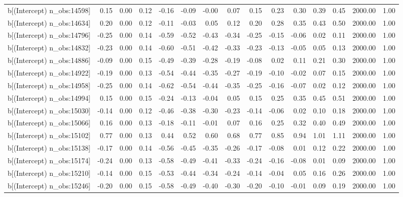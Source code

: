\begin{table}[ht]
\begin{tabular}{rrrrrrrrrrrrrrr}
  b[(Intercept) n\_obs:14598] & 0.15 & 0.00 & 0.12 & -0.16 & -0.09 & -0.00 & 0.07 & 0.15 & 0.23 & 0.30 & 0.39 & 0.45 & 2000.00 & 1.00 \\ 
  b[(Intercept) n\_obs:14634] & 0.20 & 0.00 & 0.12 & -0.11 & -0.03 & 0.05 & 0.12 & 0.20 & 0.28 & 0.35 & 0.43 & 0.50 & 2000.00 & 1.00 \\ 
  b[(Intercept) n\_obs:14796] & -0.25 & 0.00 & 0.14 & -0.59 & -0.52 & -0.43 & -0.34 & -0.25 & -0.15 & -0.06 & 0.02 & 0.11 & 2000.00 & 1.00 \\ 
  b[(Intercept) n\_obs:14832] & -0.23 & 0.00 & 0.14 & -0.60 & -0.51 & -0.42 & -0.33 & -0.23 & -0.13 & -0.05 & 0.05 & 0.13 & 2000.00 & 1.00 \\ 
  b[(Intercept) n\_obs:14886] & -0.09 & 0.00 & 0.15 & -0.49 & -0.39 & -0.28 & -0.19 & -0.08 & 0.02 & 0.11 & 0.21 & 0.30 & 2000.00 & 1.00 \\ 
  b[(Intercept) n\_obs:14922] & -0.19 & 0.00 & 0.13 & -0.54 & -0.44 & -0.35 & -0.27 & -0.19 & -0.10 & -0.02 & 0.07 & 0.15 & 2000.00 & 1.00 \\ 
  b[(Intercept) n\_obs:14958] & -0.25 & 0.00 & 0.14 & -0.62 & -0.54 & -0.44 & -0.35 & -0.25 & -0.16 & -0.07 & 0.02 & 0.12 & 2000.00 & 1.00 \\ 
  b[(Intercept) n\_obs:14994] & 0.15 & 0.00 & 0.15 & -0.24 & -0.13 & -0.04 & 0.05 & 0.15 & 0.25 & 0.35 & 0.45 & 0.51 & 2000.00 & 1.00 \\ 
  b[(Intercept) n\_obs:15030] & -0.14 & 0.00 & 0.12 & -0.46 & -0.38 & -0.30 & -0.23 & -0.14 & -0.06 & 0.02 & 0.10 & 0.18 & 2000.00 & 1.00 \\ 
  b[(Intercept) n\_obs:15066] & 0.16 & 0.00 & 0.13 & -0.18 & -0.11 & -0.01 & 0.07 & 0.16 & 0.25 & 0.32 & 0.40 & 0.49 & 2000.00 & 1.00 \\ 
  b[(Intercept) n\_obs:15102] & 0.77 & 0.00 & 0.13 & 0.44 & 0.52 & 0.60 & 0.68 & 0.77 & 0.85 & 0.94 & 1.01 & 1.11 & 2000.00 & 1.00 \\ 
  b[(Intercept) n\_obs:15138] & -0.17 & 0.00 & 0.14 & -0.56 & -0.45 & -0.35 & -0.26 & -0.17 & -0.08 & 0.01 & 0.12 & 0.22 & 2000.00 & 1.00 \\ 
  b[(Intercept) n\_obs:15174] & -0.24 & 0.00 & 0.13 & -0.58 & -0.49 & -0.41 & -0.33 & -0.24 & -0.16 & -0.08 & 0.01 & 0.09 & 2000.00 & 1.00 \\ 
  b[(Intercept) n\_obs:15210] & -0.14 & 0.00 & 0.15 & -0.53 & -0.44 & -0.34 & -0.24 & -0.14 & -0.04 & 0.05 & 0.16 & 0.26 & 2000.00 & 1.00 \\ 
  b[(Intercept) n\_obs:15246] & -0.20 & 0.00 & 0.15 & -0.58 & -0.49 & -0.40 & -0.30 & -0.20 & -0.10 & -0.01 & 0.09 & 0.19 & 2000.00 & 1.00 \\ 

\end{tabular}
\end{table}
